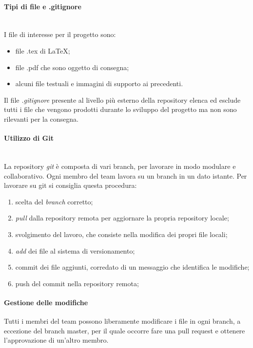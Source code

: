		\paragraph{Tipi di file e .gitignore} \mbox{}\\
		I file di interesse per il progetto sono:
		\begin{itemize}
			\item file .tex di \LaTeX{};
			\item file .pdf che sono oggetto di consegna;
			\item alcuni file testuali e immagini di supporto ai precedenti.
		\end{itemize}			
		Il file \textit{.gitignore} presente al livello più esterno della repository elenca ed esclude tutti i file che vengono prodotti durante lo sviluppo del progetto ma non sono rilevanti per la consegna.

		\paragraph{Utilizzo di Git} \mbox{}\\
		La repository \textit{git} è composta di vari branch, per lavorare in modo modulare e collaborativo. Ogni membro del team lavora su un branch in un dato istante.\newline 
		Per lavorare su git si consiglia questa procedura:
			\begin{enumerate}
			\item scelta del \textit{branch} corretto;
			\item \textit{pull} dalla repository remota per aggiornare la propria repository locale;
			\item svolgimento del lavoro, che consiste nella modifica dei propri file locali;
			\item \textit{add} dei file al sistema di versionamento;
			\item commit dei file aggiunti, corredato di un messaggio che identifica le modifiche;
			\item push del commit nella repository remota;
		\end{enumerate}
		\paragraph{Gestione delle modifiche}
		Tutti i membri del team possono liberamente modificare i file in ogni branch, a eccezione del branch master, per il quale occorre fare una pull request e ottenere l'approvazione di un'altro membro.\newline

